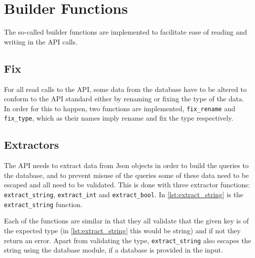 \section{Builder Functions}
The so-called builder functions are implemented to facilitate ease of reading and writing in the API calls.

\subsection{Fix}
For all read calls to the API, some data from the database have to be altered to conform to the API standard either by renaming or fixing the type of the data. In order for this to happen, two functions are implemented,  \lstinline|fix_rename| and  \lstinline|fix_type|, which as their names imply rename and fix the type respectively. 

\subsection{Extractors}
The API needs to extract data from Json objects in order to build the queries to the database, and to prevent misuse of the queries some of these data need to be escaped and all need to be validated. This is done with three extractor functions: \lstinline|extract_string|, \lstinline|extract_int| and \lstinline|extract_bool|. In \autoref{lst:extract_string} is the \lstinline|extract_string| function.



Each of the functions are similar in that they all validate that the given key is of the expected type (in \autoref{lst:extract_string} this would be string) and if not they return an error. Apart from validating the type, \lstinline|extract_string| also escapes the string using the database module, if a database is provided in the input. 
